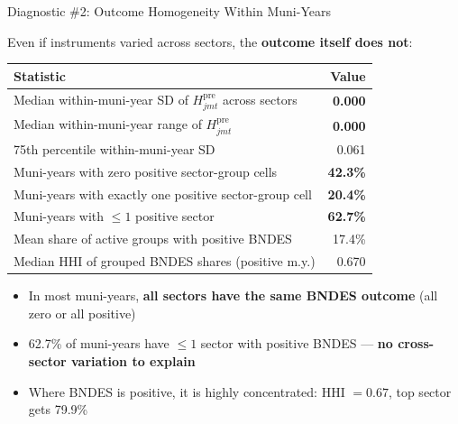 \documentclass[aspectratio=169,11pt]{beamer}
\begin{document}
\begin{frame}[shrink=5]{Diagnostic \#2: Outcome Homogeneity Within Muni-Years}

Even if instruments varied across sectors, the \textbf{outcome itself does not}:

\smallskip

\begin{center}
\small
\begin{tabular}{l r}
\toprule
\textbf{Statistic} & \textbf{Value} \\
\midrule
Median within-muni-year SD of $H^{\mathrm{pre}}_{jmt}$ across sectors & \textbf{0.000} \\
Median within-muni-year range of $H^{\mathrm{pre}}_{jmt}$ & \textbf{0.000} \\
75th percentile within-muni-year SD & 0.061 \\
\midrule
Muni-years with zero positive sector-group cells & \textbf{42.3\%} \\
Muni-years with exactly one positive sector-group cell & \textbf{20.4\%} \\
Muni-years with $\leq 1$ positive sector & \textbf{62.7\%} \\
\midrule
Mean share of active groups with positive BNDES & 17.4\% \\
Median HHI of grouped BNDES shares (positive m.y.) & 0.670 \\
\bottomrule
\end{tabular}
\end{center}

\medskip

\begin{itemize}\setlength{\itemsep}{2pt}
    \item In most muni-years, \textbf{all sectors have the same BNDES outcome} (all zero or all positive)
    \item 62.7\% of muni-years have $\leq 1$ sector with positive BNDES --- \textbf{no cross-sector variation to explain}
    \item Where BNDES is positive, it is highly concentrated: HHI $= 0.67$, top sector gets 79.9\%
\end{itemize}

\end{frame}
\end{document}
